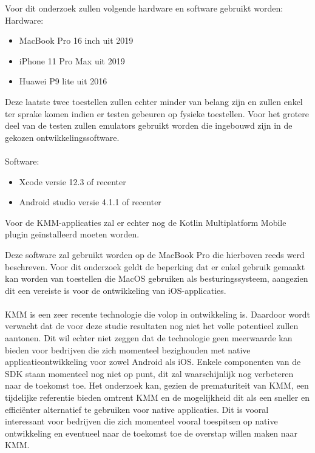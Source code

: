 Voor dit onderzoek zullen volgende hardware en software gebruikt worden:\\
Hardware:
\begin{itemize}
    \item MacBook Pro 16 inch uit 2019
    \item iPhone 11 Pro Max uit 2019
    \item Huawei P9 lite uit 2016
\end{itemize}
Deze laatste twee toestellen zullen echter minder van belang zijn en zullen enkel ter sprake komen indien er testen gebeuren op fysieke toestellen. Voor het grotere deel van de testen zullen emulators gebruikt worden die ingebouwd zijn in de gekozen ontwikkelingssoftware.\\
\\
Software:
\begin{itemize}
    \item Xcode versie 12.3 of recenter
    \item Android studio versie 4.1.1 of recenter
\end{itemize}
Voor de KMM-applicaties zal er echter nog de Kotlin Multiplatform Mobile plugin geïnstalleerd moeten worden.

Deze software zal gebruikt worden op de MacBook Pro die hierboven reeds werd beschreven. Voor dit onderzoek geldt de beperking dat er enkel gebruik gemaakt kan worden van toestellen die MacOS gebruiken als besturingssysteem, aangezien dit een vereiste is voor de ontwikkeling van iOS-applicaties.
\\ \\ 
KMM is een zeer recente technologie die volop in ontwikkeling is. Daardoor wordt verwacht dat de voor deze studie resultaten nog niet het volle potentieel zullen aantonen. Dit wil echter niet zeggen dat de technologie geen meerwaarde kan bieden voor bedrijven die zich momenteel bezighouden met native applicatieontwikkeling voor zowel Android als iOS. Enkele componenten van de SDK staan momenteel nog niet op punt, dit zal waarschijnlijk nog verbeteren naar de toekomst toe. Het onderzoek kan, gezien de prematuriteit van KMM, een tijdelijke referentie bieden omtrent KMM en de mogelijkheid dit als een sneller en efficiënter alternatief te gebruiken voor native applicaties. Dit is vooral interessant voor bedrijven die zich momenteel vooral toespitsen op native ontwikkeling en eventueel naar de toekomst toe de overstap willen maken naar KMM. 



